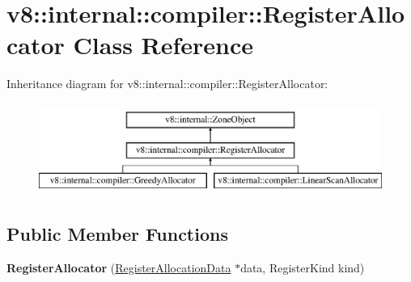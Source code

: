 \hypertarget{classv8_1_1internal_1_1compiler_1_1_register_allocator}{}\section{v8\+:\+:internal\+:\+:compiler\+:\+:Register\+Allocator Class Reference}
\label{classv8_1_1internal_1_1compiler_1_1_register_allocator}
Inheritance diagram for v8\+:\+:internal\+:\+:compiler\+:\+:Register\+Allocator\+:\begin{figure}[H]
\begin{center}
\leavevmode
\includegraphics[height=3.000000cm]{classv8_1_1internal_1_1compiler_1_1_register_allocator}
\end{center}
\end{figure}
\subsection*{Public Member Functions}
\begin{DoxyCompactItemize}
\item 
{\bfseries Register\+Allocator} (\hyperlink{classv8_1_1internal_1_1compiler_1_1_register_allocation_data}{Register\+Allocation\+Data} $\ast$data, Register\+Kind kind)\hypertarget{classv8_1_1internal_1_1compiler_1_1_register_allocator_a541582eca277a75f71e1a1a83e54307a}{}\label{classv8_1_1internal_1_1compiler_1_1_register_allocator_a541582eca277a75f71e1a1a83e54307a}

\end{DoxyCompactItemize}

